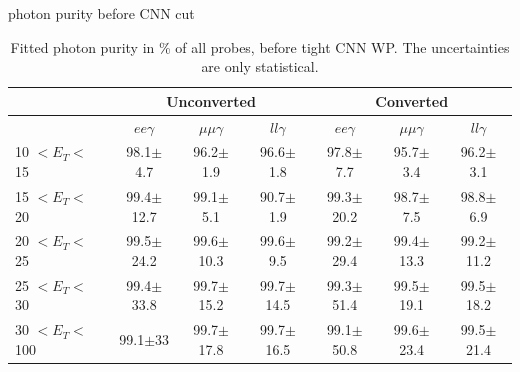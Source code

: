 \begin{frame}{photon purity before CNN cut}
\begin{table}[htbp]
\centering
\begin{tabular}{lcccccc}
\hline\hline
                             & \multicolumn{3}{c}{Unconverted}               & \multicolumn{3}{c}{Converted}                \\
                            \hline
                             & $ee\gamma$           & $\mu\mu\gamma$           & $ll\gamma$           & $ee\gamma$           &  $\mu\mu\gamma$          & $ll\gamma$           \\
    \hline
10 $ < E_T < $ 15 & 98.1$\pm$4.7   &   96.2$\pm$1.9   &   96.6$\pm$1.8   &   97.8$\pm$7.7   &   95.7$\pm$3.4    &   96.2$\pm$3.1  \\
15 $ < E_T < $ 20 & 99.4$\pm$12.7  &   99.1$\pm$5.1   &   90.7$\pm$1.9   &   99.3$\pm$20.2  &   98.7$\pm$7.5    &   98.8$\pm$6.9  \\
20 $ < E_T < $ 25 & 99.5$\pm$24.2  &   99.6$\pm$10.3  &   99.6$\pm$9.5   &   99.2$\pm$29.4  &   99.4$\pm$13.3   &   99.2$\pm$11.2 \\
25 $ < E_T < $ 30 & 99.4$\pm$33.8  &   99.7$\pm$15.2  &   99.7$\pm$14.5  &   99.3$\pm$51.4  &   99.5$\pm$19.1   &   99.5$\pm$18.2    \\
30 $ < E_T < $ 100 & 99.1$\pm$33   &   99.7$\pm$17.8  &   99.7$\pm$16.5  &   99.1$\pm$50.8  &   99.6$\pm$23.4   &   99.5$\pm$21.4 \\
\hline\hline
\end{tabular}
\caption{Fitted photon purity in \% of all probes, before tight CNN WP. The uncertainties are only statistical.}
\label{tab:gamma:CNN:Zllg:Purity:B}
\end{table}    
\end{frame}

